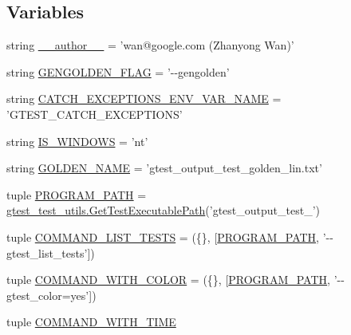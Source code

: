 \subsection*{\-Variables}
\begin{DoxyCompactItemize}
\item 
string \hyperlink{namespacegtest__output__test_a629d61dfe4da763164a4d1a2d85b0afd}{\-\_\-\-\_\-author\-\_\-\-\_\-} = 'wan@google.\-com (\-Zhanyong \-Wan)'
\item 
string \hyperlink{namespacegtest__output__test_adc44f45fdf922dea887e490f308e00b2}{\-G\-E\-N\-G\-O\-L\-D\-E\-N\-\_\-\-F\-L\-A\-G} = '-\/-\/gengolden'
\item 
string \hyperlink{namespacegtest__output__test_ac59083b4d9dffe48eab34e2f5c9cf377}{\-C\-A\-T\-C\-H\-\_\-\-E\-X\-C\-E\-P\-T\-I\-O\-N\-S\-\_\-\-E\-N\-V\-\_\-\-V\-A\-R\-\_\-\-N\-A\-M\-E} = '\-G\-T\-E\-S\-T\-\_\-\-C\-A\-T\-C\-H\-\_\-\-E\-X\-C\-E\-P\-T\-I\-O\-N\-S'
\item 
string \hyperlink{namespacegtest__output__test_ab1b21b880253abfa3ab3dfc19b06814c}{\-I\-S\-\_\-\-W\-I\-N\-D\-O\-W\-S} = 'nt'
\item 
string \hyperlink{namespacegtest__output__test_ad363abe54f765870f1e0b636207cf8c6}{\-G\-O\-L\-D\-E\-N\-\_\-\-N\-A\-M\-E} = 'gtest\-\_\-output\-\_\-test\-\_\-golden\-\_\-lin.\-txt'
\item 
tuple \hyperlink{namespacegtest__output__test_a3b816870dedd295e0dd9adf97b5f39b6}{\-P\-R\-O\-G\-R\-A\-M\-\_\-\-P\-A\-T\-H} = \hyperlink{namespacegtest__test__utils_a1bdf3cac86afa675ed37629b183048e9}{gtest\-\_\-test\-\_\-utils.\-Get\-Test\-Executable\-Path}('gtest\-\_\-output\-\_\-test\-\_\-')
\item 
tuple \hyperlink{namespacegtest__output__test_aa70dd51efa7d58dfb1b670c3218127ba}{\-C\-O\-M\-M\-A\-N\-D\-\_\-\-L\-I\-S\-T\-\_\-\-T\-E\-S\-T\-S} = (\{\}, \mbox{[}\hyperlink{namespacegtest__output__test_a3b816870dedd295e0dd9adf97b5f39b6}{\-P\-R\-O\-G\-R\-A\-M\-\_\-\-P\-A\-T\-H}, '-\/-\/gtest\-\_\-list\-\_\-tests'\mbox{]})
\item 
tuple \hyperlink{namespacegtest__output__test_a7a51a12358371da1a3070c78d16f6427}{\-C\-O\-M\-M\-A\-N\-D\-\_\-\-W\-I\-T\-H\-\_\-\-C\-O\-L\-O\-R} = (\{\}, \mbox{[}\hyperlink{namespacegtest__output__test_a3b816870dedd295e0dd9adf97b5f39b6}{\-P\-R\-O\-G\-R\-A\-M\-\_\-\-P\-A\-T\-H}, '-\/-\/gtest\-\_\-color=yes'\mbox{]})
\item 
tuple \hyperlink{namespacegtest__output__test_a1a365b5370c39cf439d8a2d73aac71e5}{\-C\-O\-M\-M\-A\-N\-D\-\_\-\-W\-I\-T\-H\-\_\-\-T\-I\-M\-E}

\end{DoxyCompactItemize}
